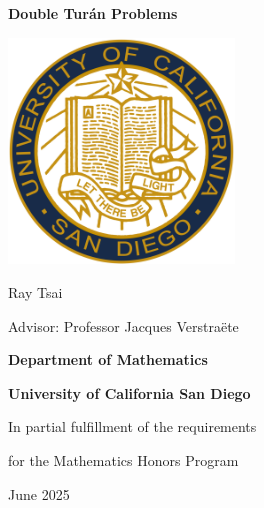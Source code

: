 \begin{titlepage}
    \vspace*{0.5cm}
    \begin{center}
        \Huge
        \textbf{Double Tur\'{a}n Problems}

        \vspace{1.5cm}

        \includegraphics[width=60mm]{images/University-of-California-San-Diego-Logo.png}

        \vspace{1cm}
        \LARGE

        Ray Tsai

        \Large

        Advisor: Professor Jacques Verstraëte
        
        \vspace{1cm}
        \large

        \textbf{Department of Mathematics}
        
        \textbf{University of California San Diego}

        \vspace{1cm}

        In partial fulfillment of the requirements

        for the Mathematics Honors Program
        
        \vspace{1cm}
        June 2025
    \end{center}
    
\end{titlepage}